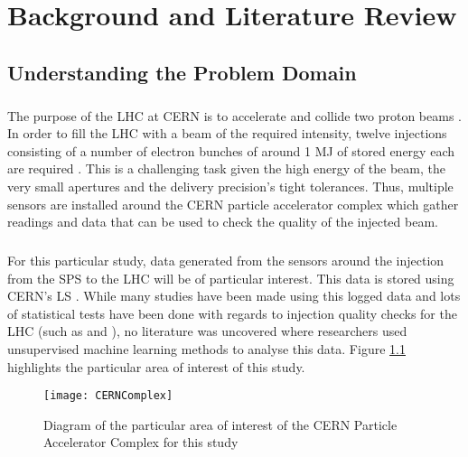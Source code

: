 \chapter{Background and Literature Review}
\section{Understanding the Problem Domain}
\paragraph{ }The purpose of the \ac{LHC} at \acs{CERN} is to accelerate and collide two proton beams \cite{Valentino2017}. In order to fill the \acs{LHC} with a beam of the required intensity, twelve injections consisting of a number of electron bunches of around 1 \acs{MJ} of stored energy each are required \cite{Drosdal2011}. This is a challenging task given the high energy of the beam, the very small apertures and the delivery precision's tight tolerances. Thus, multiple sensors are installed around the \acs{CERN} particle accelerator complex \cite{Lefevre2008} which gather readings and data that can be used to check the quality of the injected beam. 

\paragraph{ }  For this particular study, data generated from the sensors around the injection from the \acs{SPS} to the \acs{LHC} will be of particular interest. This data is stored using \acs{CERN}'s \ac{LS} \cite{Roderick2013}. While many studies have been made using this logged data and lots of statistical tests have been done with regards to injection quality checks for the \acs{LHC} (such as \cite{Drosdal2011} and \cite{Kain2010}), no literature was uncovered where researchers used unsupervised machine learning methods to analyse this data. Figure \ref{fig::SPStoLHCInjection} highlights the particular area of interest of this study.

\begin{figure}[t]
	\centering
	\texttt{[image: CERNComplex]}
	\caption[The CERN Particle Accelerator Complex]{Diagram of the particular area of interest of the CERN Particle Accelerator Complex for this study}
	\label{fig::SPStoLHCInjection}
\end{figure}

